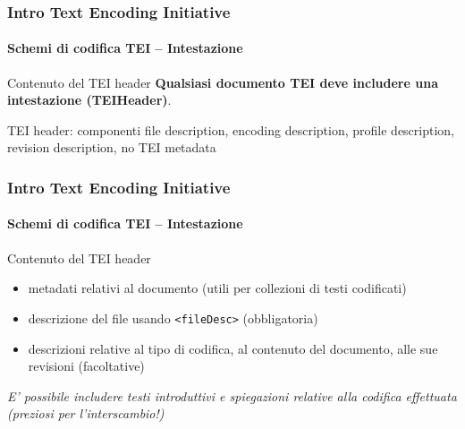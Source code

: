 


\begin{frame}
	\frametitle{Intro Text Encoding Initiative}
	\framesubtitle{Schemi di codifica TEI – Intestazione}
	\addtocounter{nframe}{1}

    \begin{block}{Contenuto del TEI header}
        \textbf{Qualsiasi documento TEI deve includere una intestazione (TEIHeader)}.
    \end{block}

    \begin{block}{TEI header: componenti}
        file description, encoding description, profile description, revision description, no TEI metadata
    \end{block}

\end{frame}

\begin{frame}
	\frametitle{Intro Text Encoding Initiative}
	\framesubtitle{Schemi di codifica TEI – Intestazione}
	\addtocounter{nframe}{1}

    \begin{block}{Contenuto del TEI header}
        \begin{itemize}
            \item metadati relativi al documento (utili per collezioni di testi
            codificati)
            \item descrizione del file usando \texttt{<fileDesc>} (obbligatoria)
            \item descrizioni relative al tipo di codifica, al contenuto del
            documento, alle sue revisioni (facoltative)
        \end{itemize}
    \end{block}
\textit{E' possibile includere testi introduttivi e spiegazioni relative alla
codifica effettuata (preziosi per l’interscambio!)}

\end{frame}



